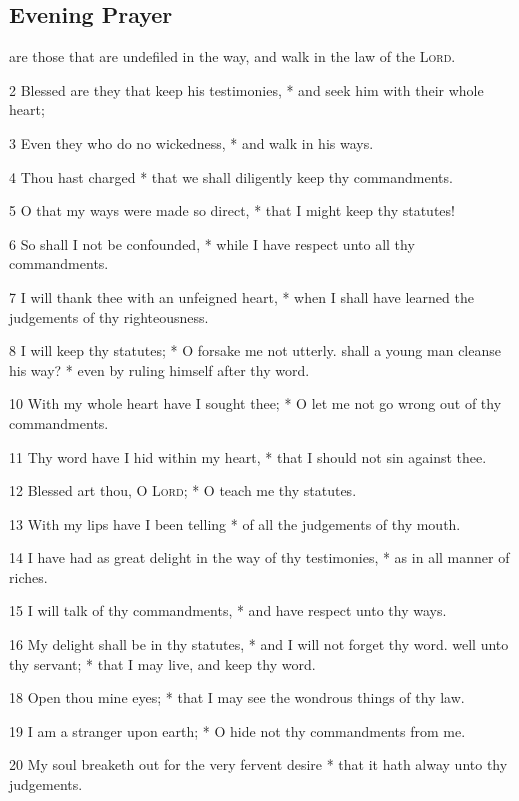 \subsection{Evening Prayer}
 are those that are undefiled in the way, and walk in the law of the {\textsc{Lord}}.\par
2 Blessed are they that keep his testimonies, * and seek him with their whole heart;\par
3 Even they who do no wickedness, * and walk in his ways.\par
4 Thou hast charged * that we shall diligently keep thy commandments.\par
5 O that my ways were made so direct, * that I might keep thy statutes!\par
6 So shall I not be confounded, * while I have respect unto all thy commandments.\par
7 I will thank thee with an unfeigned heart, * when I shall have learned the judgements of thy righteousness.\par
8 I will keep thy statutes; * O forsake me not utterly.
 shall a young man cleanse his way? * even by ruling himself after thy word.\par
10 With my whole heart have I sought thee; * O let me not go wrong out of thy commandments.\par
11 Thy word have I hid within my heart, * that I should not sin against thee.\par
12 Blessed art thou, O {\textsc{Lord}}; * O teach me thy statutes.\par
13 With my lips have I been telling * of all the judgements of thy mouth.\par
14 I have had as great delight in the way of thy testimonies, * as in all manner of riches.\par
15 I will talk of thy commandments, * and have respect unto thy ways.\par
16 My delight shall be in thy statutes, * and I will not forget thy word.
 well unto thy servant; * that I may live, and keep thy word.\par
18 Open thou mine eyes; * that I may see the wondrous things of thy law.\par
19 I am a stranger upon earth; * O hide not thy commandments from me.\par
20 My soul breaketh out for the very fervent desire * that it hath alway unto thy judgements.\par
